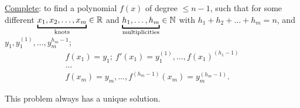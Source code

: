 \underline{Complete}: to find a polynomial $f(x)$ of degree $\leq n-1$, such that for some different $\underbracket{x_1, x_2, \ldots, x_m}_{\text{knots}} \in \R$ and $\underbracket{h_1, \ldots, h_m}_{\text{multiplicities}} \in \N$ with $h_1 + h_2 + \ldots + h_m = n$, and $y_1, y_1^{(1)}, \ldots, y_m^{h_m-1}$;
\[
    \begin{array}{c}
        f(x_1) = y_1; \ f'(x_1) = y_1^{(1)}, \ldots, f(x_1)^{(h_1-1)} \\
        \ldots \\
        f(x_m) = y_m, \ldots, f^{(h_m-1)}(x_m) = y_m^{(h_m-1)}.
    \end{array}  
\]
\begin{proposition}{}{}
    This problem always has a unique solution.
\end{proposition}